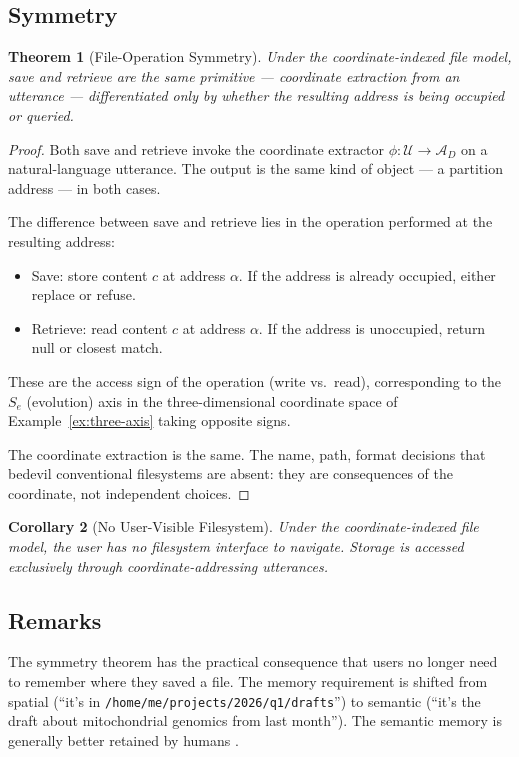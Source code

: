 \documentclass[11pt,a4paper]{article}
\newtheorem{theorem}{Theorem}[section]
\newtheorem{corollary}[theorem]{Corollary}
\theoremstyle{definition}
\theoremstyle{remark}
\newcommand{\Uc}{\mathcal{U}}
\newcommand{\Ac}{\mathcal{A}}
\begin{document}
\subsection{Symmetry}

\begin{theorem}[File-Operation Symmetry]
\label{thm:file-sym}
Under the coordinate-indexed file model, save and retrieve are the same primitive --- coordinate extraction from an utterance --- differentiated only by whether the resulting address is being occupied or queried.
\end{theorem}

\begin{proof}
Both save and retrieve invoke the coordinate extractor $\phi: \Uc \to \Ac_D$ on a natural-language utterance. The output is the same kind of object --- a partition address --- in both cases.

The difference between save and retrieve lies in the operation performed at the resulting address:
\begin{itemize}
    \item Save: store content $c$ at address $\alpha$. If the address is already occupied, either replace or refuse.
    \item Retrieve: read content $c$ at address $\alpha$. If the address is unoccupied, return null or closest match.
\end{itemize}
These are the access sign of the operation (write vs.\ read), corresponding to the $S_e$ (evolution) axis in the three-dimensional coordinate space of Example~\ref{ex:three-axis} taking opposite signs.

The coordinate extraction is the same. The name, path, format decisions that bedevil conventional filesystems are absent: they are consequences of the coordinate, not independent choices.
\end{proof}

\begin{corollary}[No User-Visible Filesystem]
\label{cor:no-fs}
Under the coordinate-indexed file model, the user has no filesystem interface to navigate. Storage is accessed exclusively through coordinate-addressing utterances.
\end{corollary}

\subsection{Remarks}

The symmetry theorem has the practical consequence that users no longer need to remember where they saved a file. The memory requirement is shifted from spatial (``it's in \texttt{/home/me/projects/2026/q1/drafts}'') to semantic (``it's the draft about mitochondrial genomics from last month''). The semantic memory is generally better retained by humans \citep{tulving1972episodic}.
\end{document}
